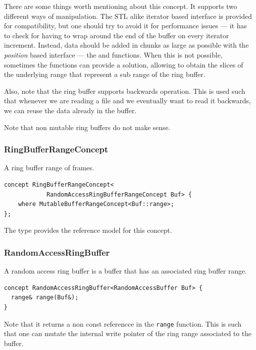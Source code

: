 There are some things worth mentioning about this concept. It supports
two different ways of manipulation. The STL alike iterator based
interface is provided for compatibility, but one should try to avoid
it for performance issues --- it has to check for having to wrap
around the end of the buffer on every iterator increment. Instead,
data should be added in chunks as large as possible with the
\emph{position} based interface --- the  and 
functions. When this is not possible, sometimes the
 functions can provide a solution, allowing to
obtain the slices of the underlying range that represent a sub range
of the ring buffer.


Also, note that the ring buffer supports backwards operation. This is
used such that whenever we are reading a file and we eventually want
to read it backwards, we can reuse the data already in the
buffer. 

Note that non mutable ring buffers do not make sense.

\subsubsection{RingBufferRangeConcept}

A ring buffer range of frames.

\begin{lstlisting}
concept RingBufferRangeConcept<
            RandomAccessRingBufferRangeConcept Buf> {
    where MutableBufferRangeConcept<Buf::range>;
};
\end{lstlisting}

The  type provides the reference model for
this concept.

\subsubsection{RandomAccessRingBuffer}

A random access ring buffer is a buffer that has an associated ring
buffer range.

\begin{lstlisting}
concept RandomAccessRingBuffer<RandomAccessBuffer Buf> {
  range& range(Buf&);
}
\end{lstlisting}

Note that it returns a non const referencce in the \texttt{range}
function. This is such that one can mutate the internal write pointer
of the ring range associated to the buffer.

